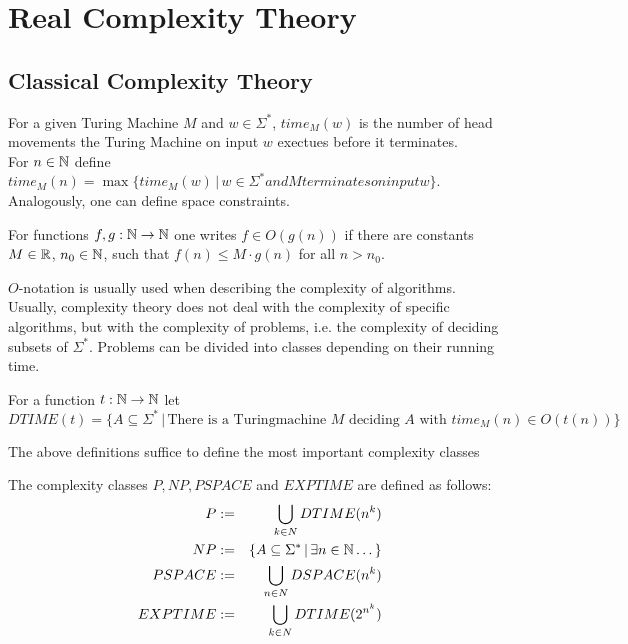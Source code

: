\section{Real Complexity Theory}\label{section:real_complexity}
	\subsection{Classical Complexity Theory}
		\begin{definition}
			For a given Turing Machine $M$ and $w \in \Sigma^*$, $time_M(w)$ is the number of head movements 
			the Turing Machine on input $w$ exectues before it terminates. \\
			For $n \in \mathbb N$ define $time_M(n) = \max \{ time_M(w) \,|\, w \in \Sigma^* and M terminates on input w \}$.\\
			Analogously, one can define space constraints.
		\end{definition}
		\begin{definition}
			For functions $f, g: \mathbb N \to \mathbb N$ one writes $f \in O(g(n))$ if there are constants $M \in \mathbb R$, $n_0 \in \mathbb N$, such that
			$ f(n) \leq M \cdot g(n)$ for all $n > n_0$. 
		\end{definition}
			$O$-notation is usually used when describing the complexity of algorithms. \\
			Usually, complexity theory does not deal with the complexity of specific algorithms, but with the complexity of problems, 
			i.e. the complexity of deciding subsets of $\Sigma^*$. Problems can be divided into classes depending on their running time.
		\begin{definition}
			For a function $t: \mathbb N \to \mathbb N$ let 
			$$ DTIME(t) = \{ A \subseteq \Sigma^* \,|\, \text{There is a Turingmachine } M \text{ deciding } A \text{ with } time_M(n) \in O(t(n)) \} $$
		\end{definition}
		The above definitions suffice to define the most important complexity classes
		\begin{definition}
			The complexity classes $P, NP, PSPACE$ and $EXPTIME$ are defined as follows:
			\begin{eqnarray*}
				P & := & \bigcup_{k \in N} DTIME(n^k) \\
				NP & := & \{A \subseteq \Sigma^* \,|\, \exists n \in \mathbb N  \dots \} \\
				PSPACE & := & \bigcup_{n \in N} DSPACE(n^k) \\
				EXPTIME & := & \bigcup_{k \in N} DTIME(2^{n^k}) \\
			\end{eqnarray*}
		\end{definition}
